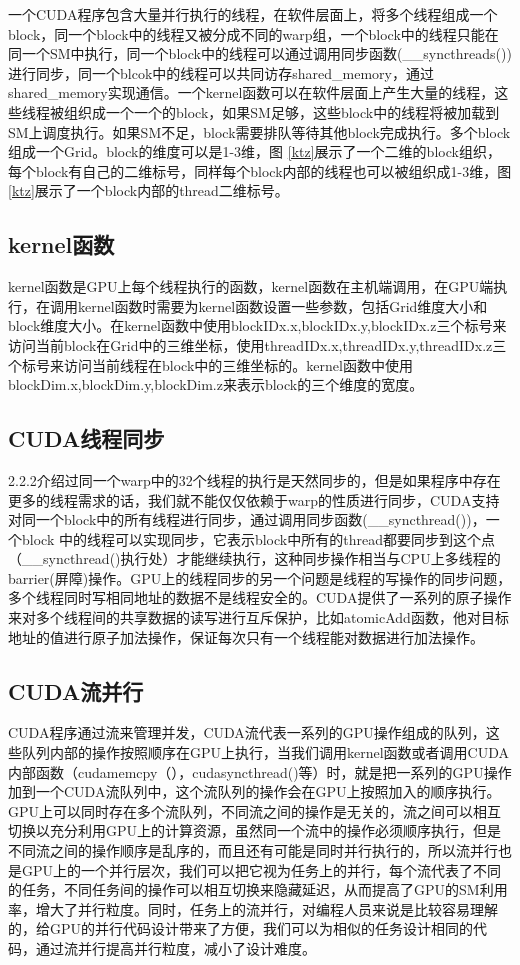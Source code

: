 一个CUDA程序包含大量并行执行的线程，在软件层面上，将多个线程组成一个block，同一个block中的线程又被分成不同的warp组，一个block中的线程只能在同一个SM中执行，同一个block中的线程可以通过调用同步函数(\_\_syncthreads())进行同步，同一个blcok中的线程可以共同访存shared\_memory，通过shared\_memory实现通信。一个kernel函数可以在软件层面上产生大量的线程，这些线程被组织成一个一个的block，如果SM足够，这些block中的线程将被加载到SM上调度执行。如果SM不足，block需要排队等待其他block完成执行。多个block组成一个Grid。block的维度可以是1-3维，图 \ref{ktz}展示了一个二维的block组织，每个block有自己的二维标号，同样每个block内部的线程也可以被组织成1-3维，图 \ref{ktz}展示了一个block内部的thread二维标号。

\subsection{kernel函数}
kernel函数是GPU上每个线程执行的函数，kernel函数在主机端调用，在GPU端执行，在调用kernel函数时需要为kernel函数设置一些参数，包括Grid维度大小和block维度大小。在kernel函数中使用blockIDx.x,blockIDx.y,blockIDx.z三个标号来访问当前block在Grid中的三维坐标，使用threadIDx.x,threadIDx.y,threadIDx.z三个标号来访问当前线程在block中的三维坐标的。kernel函数中使用blockDim.x,blockDim.y,blockDim.z来表示block的三个维度的宽度。

\subsection{CUDA线程同步}
2.2.2介绍过同一个warp中的32个线程的执行是天然同步的，但是如果程序中存在更多的线程需求的话，我们就不能仅仅依赖于warp的性质进行同步，CUDA支持对同一个block中的所有线程进行同步，通过调用同步函数(\_\_syncthread())，一个block 中的线程可以实现同步，它表示block中所有的thread都要同步到这个点（\_\_syncthread()执行处）才能继续执行，这种同步操作相当与CPU上多线程的barrier(屏障)操作。GPU上的线程同步的另一个问题是线程的写操作的同步问题，多个线程同时写相同地址的数据不是线程安全的。CUDA提供了一系列的原子操作来对多个线程间的共享数据的读写进行互斥保护，比如atomicAdd函数，他对目标地址的值进行原子加法操作，保证每次只有一个线程能对数据进行加法操作。

\subsection{CUDA流并行}
CUDA程序通过流来管理并发，CUDA流代表一系列的GPU操作组成的队列，这些队列内部的操作按照顺序在GPU上执行，当我们调用kernel函数或者调用CUDA内部函数（cudamemcpy（），cudasyncthread()等）时，就是把一系列的GPU操作加到一个CUDA流队列中，这个流队列的操作会在GPU上按照加入的顺序执行。GPU上可以同时存在多个流队列，不同流之间的操作是无关的，流之间可以相互切换以充分利用GPU上的计算资源，虽然同一个流中的操作必须顺序执行，但是不同流之间的操作顺序是乱序的，而且还有可能是同时并行执行的，所以流并行也是GPU上的一个并行层次，我们可以把它视为任务上的并行，每个流代表了不同的任务，不同任务间的操作可以相互切换来隐藏延迟，从而提高了GPU的SM利用率，增大了并行粒度。同时，任务上的流并行，对编程人员来说是比较容易理解的，给GPU的并行代码设计带来了方便，我们可以为相似的任务设计相同的代码，通过流并行提高并行粒度，减小了设计难度。

